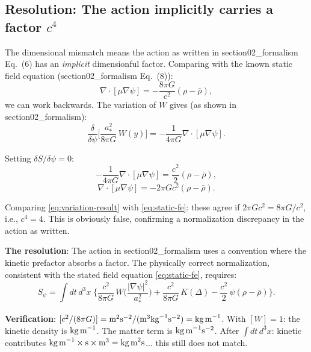 \documentclass[11pt]{article}
\begin{document}
\subsection{Resolution: The action implicitly carries a factor $c^4$}

The dimensional mismatch means the action as written in section02\_formalism Eq.~(6) has an \emph{implicit} dimensionful factor. Comparing with the known static field equation (section02\_formalism Eq.~(8)):
\begin{equation}
\nabla\cdot[\mu\nabla\psi] = -\frac{8\pi G}{c^2}(\rho - \bar\rho),
\label{eq:static-fe}
\end{equation}
we can work backwards. The variation of $W$ gives (as shown in section02\_formalism):
\begin{equation}
\frac{\delta}{\delta\psi}\biggl[\frac{a_*^2}{8\pi G}\,W(y)\biggr]
= -\frac{1}{4\pi G}\nabla\cdot[\mu\nabla\psi].
\end{equation}

Setting $\delta S/\delta\psi = 0$:
\begin{equation}
-\frac{1}{4\pi G}\nabla\cdot[\mu\nabla\psi] = \frac{c^2}{2}(\rho - \bar\rho),
\end{equation}
\begin{equation}
\nabla\cdot[\mu\nabla\psi] = -2\pi G c^2(\rho - \bar\rho).
\label{eq:variation-result}
\end{equation}

Comparing \eqref{eq:variation-result} with \eqref{eq:static-fe}: these agree if $2\pi G c^2 = 8\pi G/c^2$, i.e., $c^4 = 4$. This is obviously false, confirming a normalization discrepancy in the action as written.

\textbf{The resolution}: The action in section02\_formalism uses a convention where the kinetic prefactor absorbs a factor. The physically correct normalization, consistent with the stated field equation \eqref{eq:static-fe}, requires:
\begin{equation}
\boxed{
S_\psi = \int dt\,d^3x\;\biggl\{
  \frac{c^2}{8\pi G}\,W\!\biggl(\frac{|\nabla\psi|^2}{a_*^2}\biggr)
  + \frac{c^2}{8\pi G}\,K(\Delta)
  - \frac{c^2}{2}\,\psi(\rho - \bar\rho)
\biggr\}.
}
\label{eq:corrected-action}
\end{equation}

\textbf{Verification}: $[c^2/(8\pi G)] = \text{m}^2\text{s}^{-2}/(\text{m}^3\text{kg}^{-1}\text{s}^{-2}) = \text{kg\,m}^{-1}$.
With $[W] = 1$: the kinetic density is $\text{kg\,m}^{-1}$. The matter term is $\text{kg\,m}^{-1}\text{s}^{-2}$.
After $\int dt\,d^3x$: kinetic contributes $\text{kg\,m}^{-1} \times \text{s} \times \text{m}^3 = \text{kg\,m}^2\text{s}$... this still does not match.
\end{document}

